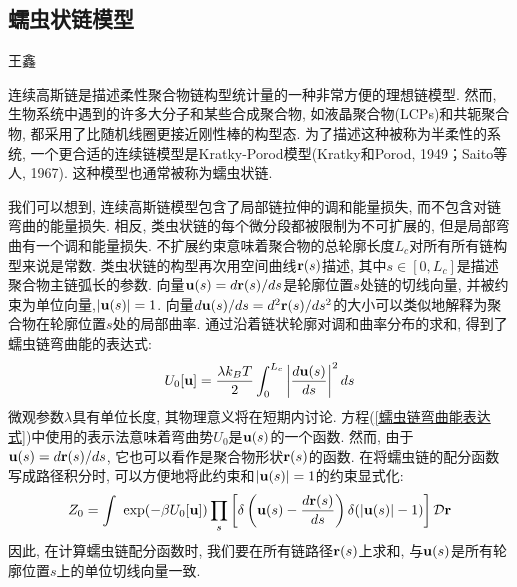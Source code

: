 \subsection{蠕虫状链模型}
{\color{red}\begin{center}
        王鑫
    \end{center}}

\qquad 连续高斯链是描述柔性聚合物链构型统计量的一种非常方便的理想链模型. 然而, 生物系统中遇到的许多大分子和某些合成聚合物, 如液晶聚合物(LCPs)和共轭聚合物, 都采用了比随机线圈更接近刚性棒的构型态. 为了描述这种被称为半柔性的系统, 一个更合适的连续链模型是Kratky-Porod模型(Kratky和Porod, 1949；Saito等人, 1967). 这种模型也通常被称为蠕虫状链. 

我们可以想到, 连续高斯链模型包含了局部链拉伸的调和能量损失, 而不包含对链弯曲的能量损失. 相反, 类虫状链的每个微分段都被限制为不可扩展的, 但是局部弯曲有一个调和能量损失. 不扩展约束意味着聚合物的总轮廓长度$L_c$对所有所有链构型来说是常数. 类虫状链的构型再次用空间曲线$\mathbf{r}(s)$描述, 其中$s\in [0,L_c]$是描述聚合物主链弧长的参数. 向量$\mathbf{u}(s)=d\mathbf{r}(s)/ds$是轮廓位置$s$处链的切线向量, 并被约束为单位向量,$|\mathbf{u}(s)| =1$. 向量$d\mathbf{u}(s)/ds=d^2\mathbf{r}(s)/ds^2$的大小可以类似地解释为聚合物在轮廓位置$s$处的局部曲率. 通过沿着链状轮廓对调和曲率分布的求和, 得到了蠕虫链弯曲能的表达式:\\
\begin{equation}
	U_0[\mathbf{u}]=\frac{\lambda k_B T}{2}\int_{0}^{L_c}\left|\frac{d\mathbf{u}(s)}{ds}\right|^2 ds \label{蠕虫链弯曲能表达式}
\end{equation}
微观参数$\lambda$具有单位长度, 其物理意义将在短期内讨论. 方程(\ref{蠕虫链弯曲能表达式})中使用的表示法意味着弯曲势$U_0$是$\mathbf{u}(s)$的一个函数. 然而, 由于$\mathbf{u}(s)=d\mathbf{r}(s)/ds$, 它也可以看作是聚合物形状$\mathbf{r}(s)$的函数. 在将蠕虫链的配分函数写成路径积分时, 可以方便地将此约束和$|\mathbf{u}(s)|=1$的约束显式化:\\
\begin{equation}
	Z_0=\int\ \exp (-\beta U_0[\mathbf{u}])\prod_s\left[\delta\left(\mathbf{u}(s)-\frac{d\mathbf{r}(s)}{ds}\right)\delta(|\mathbf{u}(s)|-1)\right] \mathcal{D} \mathbf{r}\label{蠕虫链的配分函数加约束}
\end{equation}
因此, 在计算蠕虫链配分函数时, 我们要在所有链路径$\mathbf{r}(s)$上求和, 与$\mathbf{u}(s)$是所有轮廓位置$s$上的单位切线向量一致. \\

